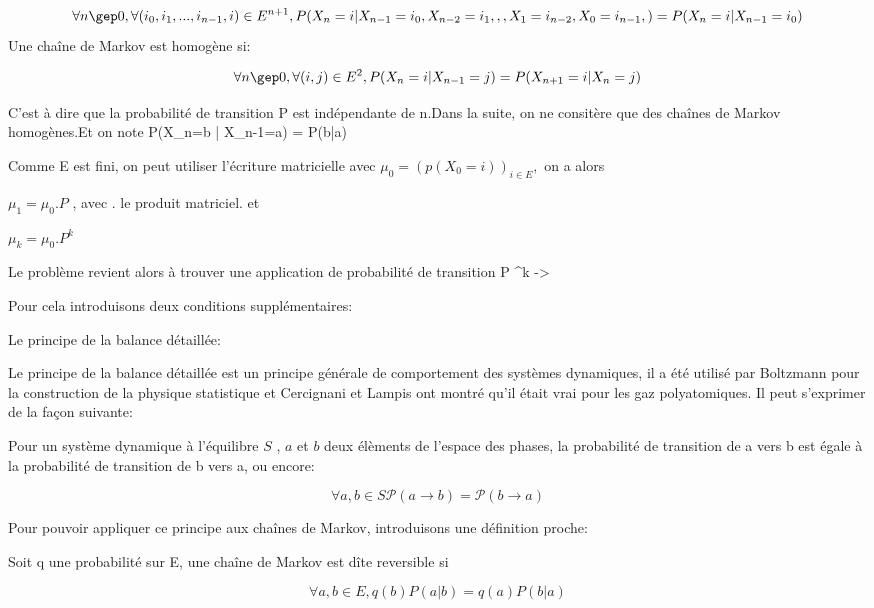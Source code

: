 \begin{equation}
\forall n \gep 0 , \forall (i_0,i_1,...,i_{n-1},i) \in E^{n+1}, P(X_n=i|X_{n-1}=i_0,X_{n-2}=i_1,,,X_{1}=i_{n-2},X_{0}=i_{n-1},) = P(X_n=i|X_{n-1}=i_0) 
\end{equation}
Une chaîne de Markov est homogène si:

\begin{equation}
  \label{eq_homog}
\forall n \gep 0 , \forall (i,j) \in E^2, P(X_n=i|X_{n-1}=j)= P(X_{n+1}=i|X_n=j) 
\end{equation}

C'est à dire que la probabilité de transition P est indépendante de n.Dans la suite, on ne consitère que des chaînes de Markov homogènes.Et on note P(X_n=b | X_{n-1}=a) = P(b|a)


Comme E est fini, on peut utiliser l'écriture matricielle avec
$\mu_0 =(p(X_0=i))_{i \in E},$
on a alors

$\mu_1 =\mu_0 . P$   , avec . le produit matriciel.
et

$\mu_k =\mu_0 . P^k$



Le problème revient alors à trouver une application de probabilité de transition P \muP^k -> \pi

Pour cela introduisons deux conditions supplémentaires:


Le principe de la balance détaillée:

Le principe de la balance détaillée  est un principe générale de comportement des systèmes dynamiques, il a été utilisé par Boltzmann pour la construction de la physique statistique et Cercignani et Lampis ont montré qu'il était vrai pour les gaz polyatomiques. Il peut s'exprimer de la façon suivante:

Pour un système dynamique à l'équilibre $S$ , $a$ et $b$ deux élèments de l'espace des phases, la probabilité de transition de a vers b est égale à la probabilité de transition de b vers a, ou encore: 

\begin{equation}
\forall a,b \in S
\mathcal{P}(a \rightarrow b) = \mathcal{P}(b \rightarrow a) 
\end{equation}

Pour pouvoir appliquer ce principe aux chaînes de Markov, introduisons une définition proche:

Soit q une probabilité sur E, une chaîne de Markov est dîte reversible si

\begin{equation}
\forall a,b \in E, q(b)P(a|b)=q(a)P(b|a)
\end{equation}


